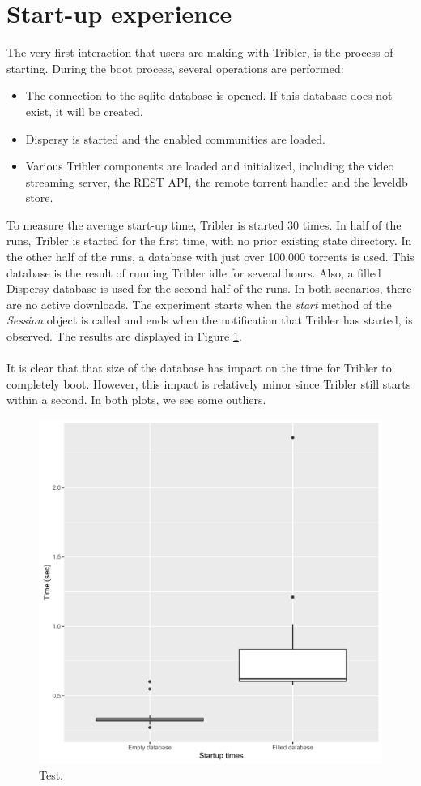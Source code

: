 \section{Start-up experience}
The very first interaction that users are making with Tribler, is the process of starting. During the boot process, several operations are performed:
\begin{itemize}
	\item The connection to the sqlite database is opened. If this database does not exist, it will be created.
	\item Dispersy is started and the enabled communities are loaded.
	\item Various Tribler components are loaded and initialized, including the video streaming server, the REST API, the remote torrent handler and the leveldb store.
\end{itemize}
To measure the average start-up time, Tribler is started 30 times. In half of the runs, Tribler is started for the first time, with no prior existing state directory. In the other half of the runs, a database with just over 100.000 torrents is used. This database is the result of running Tribler idle for several hours. Also, a filled Dispersy database is used for the second half of the runs. In both scenarios, there are no active downloads. The experiment starts when the \emph{start} method of the \emph{Session} object is called and ends when the notification that Tribler has started, is observed. The results are displayed in Figure \ref{fig:startup_experiment}.\\\\
It is clear that that size of the database has impact on the time for Tribler to completely boot. However, this impact is relatively minor since Tribler still starts within a second. In both plots, we see some outliers.

\begin{figure}[!h]
	\centering
	\includegraphics[width=0.6\columnwidth]{images/experiments/startup}
	\caption{Test.}
	\label{fig:startup_experiment}
\end{figure}

